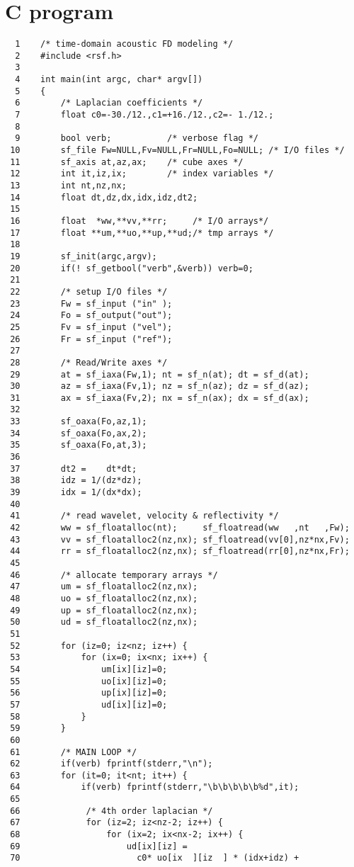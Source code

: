 \section{C program}
\begin{verbatim}
  1    /* time-domain acoustic FD modeling */
  2    #include <rsf.h>
  3
  4    int main(int argc, char* argv[])
  5    {
  6        /* Laplacian coefficients */
  7        float c0=-30./12.,c1=+16./12.,c2=- 1./12.;
  8     
  9        bool verb;           /* verbose flag */
 10        sf_file Fw=NULL,Fv=NULL,Fr=NULL,Fo=NULL; /* I/O files */
 11        sf_axis at,az,ax;    /* cube axes */
 12        int it,iz,ix;        /* index variables */
 13        int nt,nz,nx;
 14        float dt,dz,dx,idx,idz,dt2;
 15
 16        float  *ww,**vv,**rr;     /* I/O arrays*/
 17        float **um,**uo,**up,**ud;/* tmp arrays */
 18
 19        sf_init(argc,argv);
 20        if(! sf_getbool("verb",&verb)) verb=0;
 21
 22        /* setup I/O files */
 23        Fw = sf_input ("in" );
 24        Fo = sf_output("out");
 25        Fv = sf_input ("vel");
 26        Fr = sf_input ("ref");
 27
 28        /* Read/Write axes */
 29        at = sf_iaxa(Fw,1); nt = sf_n(at); dt = sf_d(at);
 30        az = sf_iaxa(Fv,1); nz = sf_n(az); dz = sf_d(az);
 31        ax = sf_iaxa(Fv,2); nx = sf_n(ax); dx = sf_d(ax);
 32
 33        sf_oaxa(Fo,az,1); 
 34        sf_oaxa(Fo,ax,2); 
 35        sf_oaxa(Fo,at,3);
 36
 37        dt2 =    dt*dt;
 38        idz = 1/(dz*dz);
 39        idx = 1/(dx*dx);
 40 
 41        /* read wavelet, velocity & reflectivity */
 42        ww = sf_floatalloc(nt);     sf_floatread(ww   ,nt   ,Fw);
 43        vv = sf_floatalloc2(nz,nx); sf_floatread(vv[0],nz*nx,Fv);
 44        rr = sf_floatalloc2(nz,nx); sf_floatread(rr[0],nz*nx,Fr);
 45 
 46        /* allocate temporary arrays */
 47        um = sf_floatalloc2(nz,nx);
 48        uo = sf_floatalloc2(nz,nx);
 49        up = sf_floatalloc2(nz,nx);
 50        ud = sf_floatalloc2(nz,nx);
 51
 52        for (iz=0; iz<nz; iz++) {
 53            for (ix=0; ix<nx; ix++) {
 54                um[ix][iz]=0;
 55                uo[ix][iz]=0;
 56                up[ix][iz]=0;
 57                ud[ix][iz]=0;
 58            }
 59        }
 60
 61        /* MAIN LOOP */
 62        if(verb) fprintf(stderr,"\n");
 63        for (it=0; it<nt; it++) {
 64            if(verb) fprintf(stderr,"\b\b\b\b\b%d",it);
 65  
 66             /* 4th order laplacian */
 67             for (iz=2; iz<nz-2; iz++) {
 68                 for (ix=2; ix<nx-2; ix++) {
 69                     ud[ix][iz] = 
 70                       c0* uo[ix  ][iz  ] * (idx+idz) + 

\end{verbatim}
